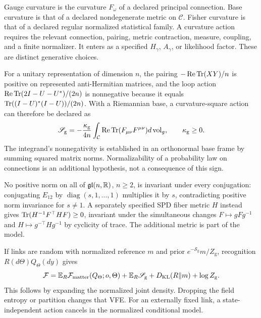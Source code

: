 Gauge curvature is the curvature $F_{\omega}$ of a declared principal
connection. Base curvature is that of a declared nondegenerate metric on
$\mathcal C$. Fisher curvature is that of a declared regular normalized
statistical family. A curvature action requires the relevant connection,
pairing, metric contraction, measure, coupling, and a finite normalizer.
It enters as a specified $H_\gamma$, $A_\gamma$, or likelihood factor.
These are distinct generative choices. 

For a unitary representation of dimension $n$, the pairing
$-\operatorname{Re}\operatorname{Tr}(XY)/n$ is positive on represented anti-Hermitian
matrices, and the loop action
$\operatorname{Re}\operatorname{Tr}(2I-U-U^*)/(2n)$ is nonnegative because it equals
$\operatorname{Tr}((I-U)^*(I-U))/(2n)$. With a Riemannian base, a curvature-square
action can therefore be declared as
\begin{equation}
 \mathscr S_{\mathrm g}=
 -\frac{\kappa_{\mathrm g}}{4n}\int_{\mathcal C}
 \operatorname{Re}\operatorname{Tr}(F_{\mu\nu}F^{\mu\nu})d\operatorname{vol}_g,
 \qquad \kappa_{\mathrm g}\geq0.
 \label{eq:rg-geometry-gauge-action}
\end{equation}
The integrand's nonnegativity is established in an orthonormal base frame by
summing squared matrix norms. Normalizability of a probability law on
connections is an additional hypothesis, not a consequence of this sign.

No positive norm on all of $\mathfrak{gl}(n,\mathbb R)$, $n\geq2$, is invariant
under every conjugation: conjugating $E_{12}$ by
$\operatorname{diag}(s,1,\ldots,1)$ multiplies it by $s$, contradicting
positive norm invariance for $s\ne1$. A separately specified SPD fiber
metric $H$ instead gives
$\operatorname{Tr}(H^{-1}F^\top HF)\geq0$, invariant under the simultaneous changes
$F\mapsto gFg^{-1}$ and $H\mapsto g^{-\top}Hg^{-1}$ by cyclicity of
trace. The additional metric is part of the model. 

If links are random with normalized reference $m$ and prior
$e^{-\mathscr S_{\mathrm g}}m/Z_{\mathrm g}$, recognition
$R(d\Theta)Q_\Theta(dy)$ gives
\begin{equation}
 \mathcal F=\mathbb E_R\mathcal F_{\mathrm{matter}}(Q_\Theta;o,\Theta)
 +\mathbb E_R\mathscr S_{\mathrm g}+D_{\mathrm{KL}}(R\Vert m)+\log Z_{\mathrm g}.
 \label{eq:rg-geometry-random-link-vfe}
\end{equation}
This follows by expanding the normalized joint density. Dropping the field
entropy or partition changes that VFE. For an externally fixed link,
a state-independent action cancels in the normalized conditional model.

